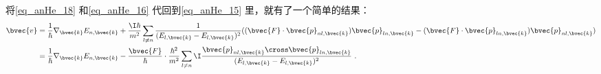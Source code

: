 将\autoref{eq_anHe_18} 和\autoref{eq_anHe_16} 代回到\autoref{eq_anHe_15} 里，就有了一个简单的结果：
\begin{equation}
\begin{aligned}
\bvec{v}&=\frac{1}{\hbar}\nabla_{\bvec{k}}E_{n,\bvec{k}}+\frac{\I\hbar}{m^2}\sum_{l\neq n}\frac{1}{(E_{l,\bvec{k}}-E_{l,\bvec{k}})^2}((\bvec{F}\cdot\bvec{p}_{nl,\bvec{k}})\bvec{p}_{ln,\bvec{k}}-(\bvec{F}\cdot\bvec{p}_{ln,\bvec{k}})\bvec{p}_{nl,\bvec{k}})\\
&=\frac{1}{\hbar}\nabla_{\bvec{k}}E_{n,\bvec{k}}-\frac{\bvec{F}}{\hbar}\cdot\frac{\hbar^2}{m^2}\sum_{l\neq n}\I\frac{\bvec{p}_{nl,\bvec{k}}\cross\bvec{p}_{ln,\bvec{k}}}{(E_{l,\bvec{k}}-E_{l,\bvec{k}})^2}~.
\end{aligned}
\end{equation}







